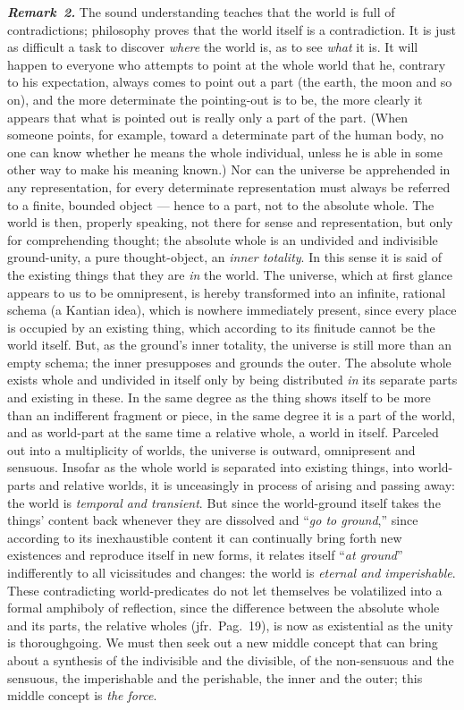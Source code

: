 \documentclass[12pt]{book}
\newcommand{\anm}[1]{\emph{\textbf{Remark~#1.}}}
\begin{document}
\anm{2} The sound understanding teaches that the world is full of
contradictions; philosophy proves that the world itself is a contradiction.
It is just as difficult a task to discover \emph{where} the world is, as to
see \emph{what} it is. It will happen to everyone who attempts to point at
the whole world that he, contrary to his expectation, always comes to point
out a part (the earth, the moon and so on), and the more determinate the
pointing-out is to be, the more clearly it appears that what is pointed out
is really only a part of the part. (When someone points, for example, toward
a determinate part of the human body, no one can know whether he means the
whole individual, unless he is able in some other way to make his meaning
known.) Nor can the universe be apprehended in any representation, for every
determinate representation must always be referred to a finite, bounded
object --- hence to a part, not to the absolute whole. The world is then,
properly speaking, not there for sense and representation, but only for
comprehending thought; the absolute whole is an undivided and indivisible
ground-unity, a pure thought-object, an \emph{inner totality}. In this sense
it is said of the existing things that they are \emph{in} the world. The
universe, which at first glance appears to us to be omnipresent, is hereby
transformed into an infinite, rational schema (a Kantian idea), which is
nowhere immediately present, since every place is occupied by an existing
thing, which according to its finitude cannot be the world itself. But, as
the ground's inner totality, the universe is still more than an empty
schema; the inner presupposes and grounds the outer. The absolute whole
exists whole and undivided in itself only by being distributed \emph{in} its
separate parts and existing in these. In the same degree as the thing shows
itself to be more than an indifferent fragment or piece, in the same degree
it is a part of the world, and as world-part at the same time a relative
whole, a world in itself. Parceled out into a multiplicity of worlds, the
universe is outward, omnipresent and sensuous. Insofar as the whole world is
separated into existing things, into world-parts and relative worlds, it is
unceasingly in process of arising and passing away: the world is
\emph{temporal and transient}. But since the world-ground itself takes the
things' content back whenever they are dissolved and ``\emph{go to
ground},'' since according to its inexhaustible content it can continually
bring forth new existences and reproduce itself in new forms, it relates
itself ``\emph{at ground}'' indifferently to all vicissitudes and changes:
the world is \emph{eternal and imperishable}. These contradicting
world-predicates do not let themselves be volatilized into a formal
amphiboly of reflection, since the difference between the absolute whole and
its parts, the relative wholes (jfr.\ Pag.\ 19), is now as existential as
the unity is thoroughgoing. We must then seek out a new middle concept that
can bring about a synthesis of the indivisible and the divisible, of the
non-sensuous and the sensuous, the imperishable and the perishable, the
inner and the outer; this middle concept is \emph{the force}.
\end{document}

